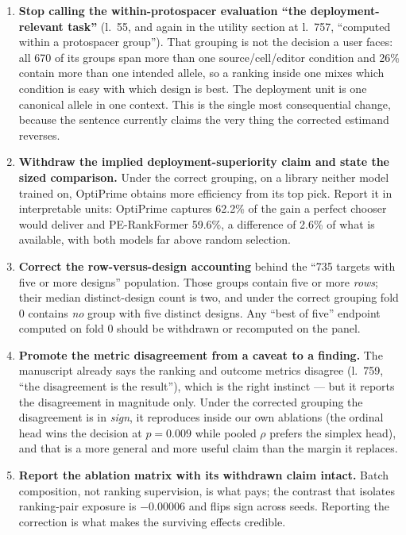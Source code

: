 \documentclass[11pt]{article}
\begin{document}
\begin{enumerate}\itemsep4pt
\item \textbf{Stop calling the within-protospacer evaluation ``the deployment-relevant task''}
(l.~55, and again in the utility section at l.~757, ``computed within a protospacer
group'').
That grouping is not the decision a user faces: all 670 of its groups span more than one
source/cell/editor condition and 26\% contain more than one intended allele, so a ranking
inside one mixes which condition is easy with which design is best. The deployment unit is
one canonical allele in one context. This is the single most consequential change, because
the sentence currently claims the very thing the corrected estimand reverses.

\item \textbf{Withdraw the implied deployment-superiority claim and state the sized
comparison.} Under the correct grouping, on a library neither model trained on, OptiPrime
obtains more efficiency from its top pick. Report it in interpretable units: OptiPrime
captures 62.2\% of the gain a perfect chooser would deliver and PE-RankFormer 59.6\%, a
difference of 2.6\% of what is available, with both models far above random selection.

\item \textbf{Correct the row-versus-design accounting} behind the ``735 targets with five or
more designs'' population. Those groups contain five or more \emph{rows}; their median
distinct-design count is two, and under the correct grouping fold 0 contains \emph{no} group
with five distinct designs. Any ``best of five'' endpoint computed on fold 0 should be
withdrawn or recomputed on the panel.

\item \textbf{Promote the metric disagreement from a caveat to a finding.} The manuscript
already says the ranking and outcome metrics disagree (l.~759, ``the disagreement is the
result''), which is the right instinct --- but it reports the disagreement in magnitude only.
Under the corrected grouping the disagreement is in \emph{sign}, it reproduces inside our own
ablations (the ordinal head wins the decision at $p = 0.009$ while pooled $\rho$ prefers the
simplex head), and that is a more general and more useful claim than the margin it replaces.

\item \textbf{Report the ablation matrix with its withdrawn claim intact.} Batch composition,
not ranking supervision, is what pays; the contrast that isolates ranking-pair exposure is
$-0.00006$ and flips sign across seeds. Reporting the correction is what makes the surviving
effects credible.


\end{enumerate}
\end{document}
